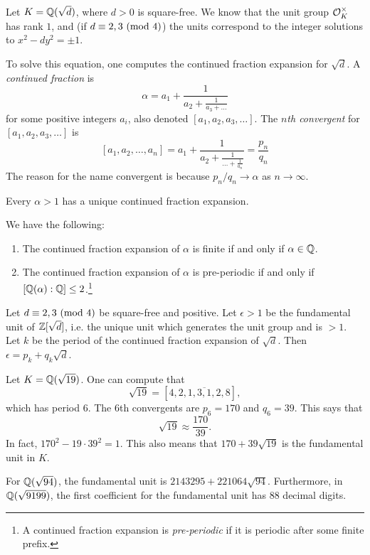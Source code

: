 \begin{example}
  Let $K = \mathbb{Q}(\sqrt{d})$, where $d > 0$ is square-free.
  We know that the unit group $\mathcal{O}_K^\times$ has rank
  $1$, and (if $d \equiv 2, 3 \ (\mathrm{mod}\ 4)$) the units
  correspond to the integer solutions
  to $x^2 - d y^2 = \pm 1$.

  To solve this equation, one computes the continued
  fraction expansion for $\sqrt{d}$. A \emph{continued
  fraction} is
  \[
    \alpha = a_1 + \frac{1}{a_2 + \displaystyle \frac{1}{a_3 + \dots}}
  \]
  for some positive integers $a_i$, also denoted
  $[a_1, a_2, a_3, \dots]$. The \emph{$n$th convergent}
  for $[a_1, a_2, a_3, \dots]$ is
  \[
    [a_1, a_2, \dots, a_n] =
    a_1 + \frac{1}{a_2 + \displaystyle \frac{1}{\dots + \displaystyle \frac{1}{a_n}}} = \frac{p_n}{q_n}
  \]
  The reason for the name convergent is because
  $p_n / q_n \to \alpha$ as $n \to \infty$.
\end{example}

\begin{theorem}
  Every $\alpha > 1$ has a unique continued fraction
  expansion.
\end{theorem}

\begin{theorem}
  We have the following:
  \begin{enumerate}
    \item The continued fraction expansion of $\alpha$
      is finite if and only if $\alpha \in \mathbb{Q}$.
    \item The continued fraction expansion of $\alpha$
      is pre-periodic if and only if
      $[\mathbb{Q}(\alpha) : \mathbb{Q}] \le 2$.\footnote{A continued fraction expansion is \emph{pre-periodic} if it is periodic after some finite prefix.}
  \end{enumerate}
\end{theorem}

\begin{theorem}
  Let $d \equiv 2, 3 \ (\mathrm{mod}\ 4)$ be square-free and
  positive. Let $\epsilon > 1$ be the
  fundamental unit of $\mathbb{Z}[\sqrt{d}]$, i.e.
  the unique unit which generates the unit group
  and is $> 1$. Let $k$ be the period of the
  continued fraction expansion of $\sqrt{d}$. Then
  $\epsilon = p_k + q_k \sqrt{d}$.
\end{theorem}

\begin{example}
  Let $K = \mathbb{Q}(\sqrt{19})$. One can compute that
  \[
    \sqrt{19} = [4, \overline{2, 1, 3, 1, 2, 8}],
  \]
  which has period $6$. The $6$th convergents
  are $p_6 = 170$ and $q_6 = 39$. This says that
  \[
    \sqrt{19} \approx \frac{170}{39}.
  \]
  In fact, $170^2 - 19 \cdot 39^2 = 1$. This also
  means that $170 + 39 \sqrt{19}$ is the fundamental
  unit in $K$.
\end{example}

\begin{remark}
  For $\mathbb{Q}(\sqrt{94})$, the fundamental unit is
  $2143295 + 221064\sqrt{94}$. Furthermore, in
  $\mathbb{Q}(\sqrt{9199})$, the first coefficient for
  the fundamental unit has $88$ decimal digits.
\end{remark}

